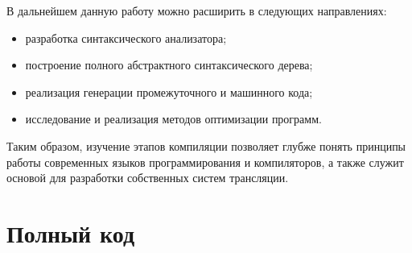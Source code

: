 \documentclass[coursework]{SCWorks}
\begin{document}
В дальнейшем данную работу можно расширить в следующих направлениях:
\begin{itemize}
    \item разработка синтаксического анализатора;
    \item построение полного абстрактного синтаксического дерева;
    \item реализация генерации промежуточного и машинного кода;
    \item исследование и реализация методов оптимизации программ.
\end{itemize}


Таким образом, изучение этапов компиляции позволяет глубже понять принципы работы современных языков 
программирования и компиляторов, а также служит основой для разработки собственных систем трансляции.
\nocite{*}



\appendix
\section{Полный код}

\inputminted{cpp}{code_example.cpp}
\end{document}
